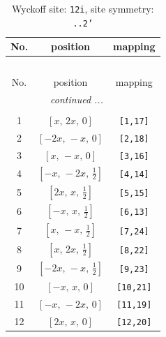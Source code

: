 \documentclass[fleqn,8pt]{jsarticle}
\begin{document}
\begin{longtable}{ccc}
\caption{Wyckoff site: {\tt 12i}, site symmetry: {\tt ..2'}}
 \\
 \hline \hline
No. & position & mapping \\ \hline \endfirsthead

\multicolumn{2}{l}{\tablename\ \thetable{}} \\
 \hline \hline
No. & position & mapping \\ \hline \endhead

 \hline \hline
\multicolumn{2}{r}{\footnotesize\it continued ...} \\ \endfoot

 \hline \hline
\multicolumn{2}{r}{} \\ \endlastfoot

1 & $\left[ x,\, 2 x,\, 0 \right]$ & {\tt [1,17]} \\ \hline
2 & $\left[ - 2 x,\, - x,\, 0 \right]$ & {\tt [2,18]} \\ \hline
3 & $\left[ x,\, - x,\, 0 \right]$ & {\tt [3,16]} \\ \hline
4 & $\left[ - x,\, - 2 x,\, \frac{1}{2} \right]$ & {\tt [4,14]} \\ \hline
5 & $\left[ 2 x,\, x,\, \frac{1}{2} \right]$ & {\tt [5,15]} \\ \hline
6 & $\left[ - x,\, x,\, \frac{1}{2} \right]$ & {\tt [6,13]} \\ \hline
7 & $\left[ x,\, - x,\, \frac{1}{2} \right]$ & {\tt [7,24]} \\ \hline
8 & $\left[ x,\, 2 x,\, \frac{1}{2} \right]$ & {\tt [8,22]} \\ \hline
9 & $\left[ - 2 x,\, - x,\, \frac{1}{2} \right]$ & {\tt [9,23]} \\ \hline
10 & $\left[ - x,\, x,\, 0 \right]$ & {\tt [10,21]} \\ \hline
11 & $\left[ - x,\, - 2 x,\, 0 \right]$ & {\tt [11,19]} \\ \hline
12 & $\left[ 2 x,\, x,\, 0 \right]$ & {\tt [12,20]} \\
\end{longtable}
\renewcommand{\arraystretch}{1.2}
\end{document}
